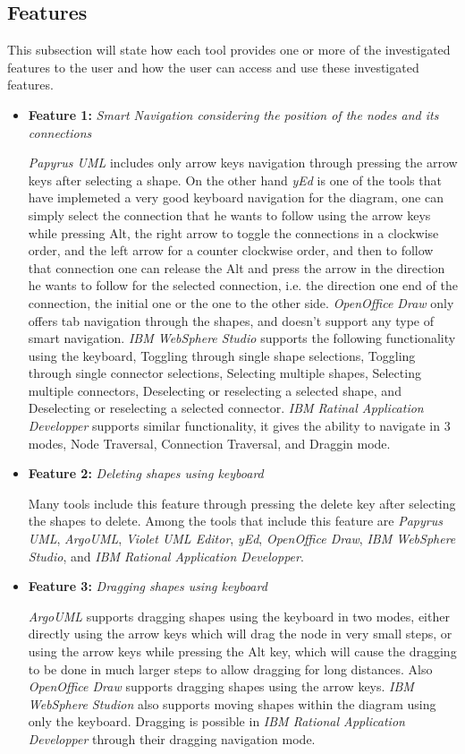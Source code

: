 \subsection{Features}
This subsection will state how each tool provides one or more of the investigated features to the user and how the user can access and use these investigated features.
\begin{itemize}
\item {\bf Feature 1:} {\em Smart Navigation considering the position of the nodes and its connections}
\par \noindent
{\em Papyrus UML} includes only arrow keys navigation through pressing the arrow keys after selecting a shape. On the other hand {\em yEd} is one of the tools that have implemeted a very good keyboard navigation for the diagram, one can simply select the connection that he wants to follow using the arrow keys while pressing Alt, the right arrow to toggle the connections in a clockwise order, and the left arrow for a counter clockwise order, and then to follow that connection one can release the Alt and press the arrow in the direction he wants to follow for the selected connection, i.e. the direction one end of the connection, the initial one or the one to the other side. {\em OpenOffice Draw} only offers tab navigation through the shapes, and doesn't support any type of smart navigation. {\em IBM WebSphere Studio} supports the following functionality using the keyboard, Toggling through single shape selections, Toggling through single connector selections, Selecting multiple shapes, Selecting multiple connectors, Deselecting or reselecting a selected shape, and Deselecting or reselecting a selected connector. {\em IBM Ratinal Application Developper} supports similar functionality, it gives the ability to navigate in 3 modes, Node Traversal, Connection Traversal, and Draggin mode.


\item {\bf Feature 2:} {\em Deleting shapes using keyboard}
\par \noindent
Many tools include this feature through pressing the delete key after selecting the shapes to delete. Among the tools that include this feature are {\em Papyrus UML}, {\em ArgoUML}, {\em Violet UML Editor}, {\em yEd}, {\em OpenOffice Draw}, {\em IBM WebSphere Studio}, and {\em IBM Rational Application Developper}.

\item {\bf Feature 3:} {\em Dragging shapes using keyboard}
\par \noindent
{\em ArgoUML} supports dragging shapes using the keyboard in two modes, either directly using the arrow keys which will drag the node in very small steps, or using the arrow keys while pressing the Alt key, which will cause the dragging to be done in much larger steps to allow dragging for long distances. Also {\em OpenOffice Draw} supports dragging shapes using the arrow keys. {\em IBM WebSphere Studion} also supports moving shapes within the diagram using only the keyboard. Dragging is possible in {\em IBM Rational Application Developper} through their dragging navigation mode.


\end{itemize}
